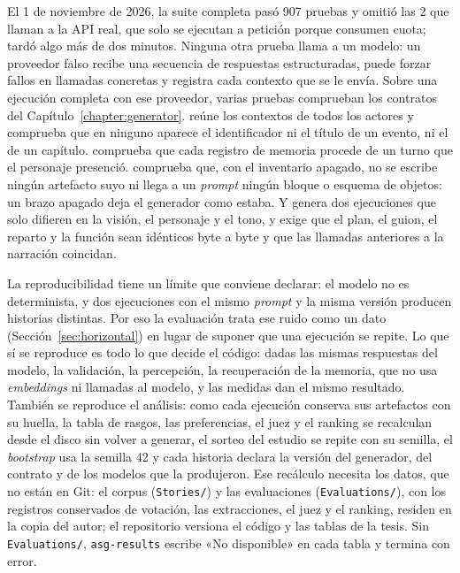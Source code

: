 El 1 de noviembre de 2026, la suite completa pasó 907 pruebas y omitió las 2 que llaman a la API
real, que solo se ejecutan a petición porque consumen cuota; tardó algo más de dos minutos. Ninguna
otra prueba llama a un modelo: un proveedor falso recibe una secuencia de respuestas estructuradas,
puede forzar fallos en llamadas concretas y registra cada contexto que se le envía. Sobre una
ejecución completa con ese proveedor, varias pruebas comprueban los contratos del
Capítulo~\ref{chapter:generator}.  reúne
los contextos de todos los actores y comprueba que en ninguno aparece el identificador ni el título
de un evento, ni el de un capítulo. 
comprueba que cada registro de memoria procede de un turno que el personaje presenció.
 comprueba que, con el
inventario apagado, no se escribe ningún artefacto suyo ni llega a un \textit{prompt} ningún bloque
o esquema de objetos: un brazo apagado deja el generador como estaba. Y
 genera dos ejecuciones que solo difieren en la
visión, el personaje y el tono, y exige que el plan, el guion, el reparto y la función sean idénticos
byte a byte y que las llamadas anteriores a la narración coincidan.

La reproducibilidad tiene un límite que conviene declarar: el modelo no es determinista, y dos
ejecuciones con el mismo \textit{prompt} y la misma versión producen historias distintas. Por eso la
evaluación trata ese ruido como un dato (Sección~\ref{sec:horizontal}) en lugar de suponer que una
ejecución se repite. Lo que sí se reproduce es todo lo que decide el código: dadas las mismas
respuestas del modelo, la validación, la percepción, la recuperación de la memoria, que no usa
\textit{embeddings} ni llamadas al modelo, y las medidas dan el mismo resultado. También se
reproduce el análisis: como cada ejecución conserva sus artefactos con su huella, la tabla de
rasgos, las preferencias, el juez y el ranking se recalculan desde el disco sin volver a generar, el
sorteo del estudio se repite con su semilla, el \textit{bootstrap} usa la semilla 42 y cada historia
declara la versión del generador, del contrato y de los modelos que la produjeron. Ese recálculo
necesita los datos, que no están en Git: el corpus (\texttt{Stories/}) y las evaluaciones
(\texttt{Evaluations/}), con los registros conservados de votación, las extracciones, el juez y el ranking, residen en
la copia del autor; el repositorio versiona el código y las tablas de la tesis. Sin
\texttt{Evaluations/}, \texttt{asg-results} escribe «No disponible» en cada tabla y termina con error.

